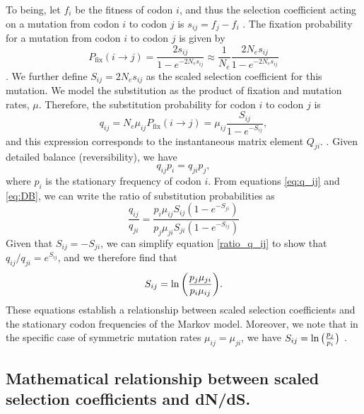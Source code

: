 \documentclass{pnastwo}
\begin{document}
\begin{article}
To being, let $f_i$ be the fitness of codon $i$, and thus the selection coefficient acting on a mutation from codon $i$ to codon $j$ is $s_{ij} = f_j - f_i$ \cite{SellaHirsh2005,YangNielsen2008}. The fixation probability for a mutation from codon $i$ to codon $j$ is given by 
\begin{equation}\label{eq:pfix}
P_\text{fix}(i \rightarrow j) = \frac{2s_{ij}}{1 - e^{-2N_es_{ij}}} \approx \frac{1}{N_e}\frac{2N_es_{ij}}{1 - e^{-2N_es_{ij}}} 
\end{equation} \cite{Kimura1962,HalpernBruno1998,YangNielsen2008}. We further define $S_{ij} = 2N_es_{ij}$ as the scaled selection coefficient for this mutation. We model the substitution as the product of fixation and mutation rates, $\mu$. Therefore, the substitution probability for codon $i$ to codon $j$ is 
\begin{equation}\label{eq:q_ij}
q_{ij} = N_e\mu_{ij}P_\text{fix}(i \rightarrow j) = \mu_{ij}\frac{S_{ij}}{1 - e^{-S_{ij}}} , 
\end{equation} and this expression corresponds to the instantaneous matrix element $Q_{ji}$. 
\cite{HalpernBruno1998,SellaHirsh2005}. Given detailed balance (reversibility), we have 
\begin{equation}\label{eq:DB}
q_{ij}p_i = q_{ji}p_j,
\end{equation} 
where $p_i$ is the stationary frequency of codon $i$. From equations \eqref{eq:q_ij} and \eqref{eq:DB}, we can write the ratio of substitution probabilities as 
\begin{equation}\label{ratio_q_ij}
\frac{q_{ij}}{q_{ji}} = \frac{p_i \mu_{ij} S_{ij} (1-e^{-S_{ji}})}{p_j \mu_{ji} S_{ji} (1-e^{-S_{ij}})} 
\end{equation}
Given that $S_{ij} = -S_{ji}$, we can simplify equation \eqref{ratio_q_ij} to show that $q_{ij}/q_{ji} = e^{S_{ij}}$, and we therefore find that
\begin{equation}\label{eq:s_pmu}
S_{ij} = \ln\bigg{(} \frac{p_j\mu_{ji}}{p_i\mu_{ij}} \bigg{)}. 
\end{equation}
These equations establish a relationship between scaled selection coefficients and the stationary codon frequencies of the Markov model. Moreover, we note that in the specific case of symmetric mutation rates $\mu_{ij} = \mu_{ji}$, we have $S_{ij} = \ln\big{(}{\frac{p_j} {p_i}}\big{)}$ \cite{SellaHirsh2005}. 


		
\subsection*{Mathematical relationship between scaled selection coefficients and dN/dS.} 


\end{article}
\end{document}
